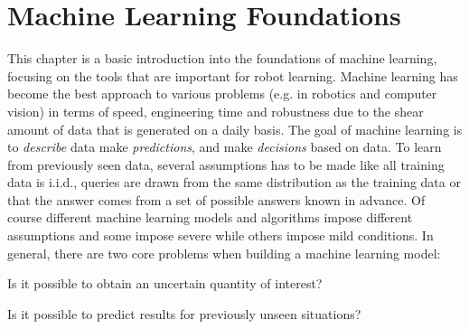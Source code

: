 \chapter{Machine Learning Foundations}
	This chapter is a basic introduction into the foundations of machine learning, focusing on the tools that are important for robot learning. Machine learning has become the best approach to various problems (e.g. in robotics and computer vision) in terms of speed, engineering time and robustness due to the shear amount of data that is generated on a daily basis. The goal of machine learning is to \emph{describe} data make \emph{predictions}, and make \emph{decisions} based on data. To learn from previously seen data, several assumptions has to be made like all training data is i.i.d., queries are drawn from the same distribution as the training data or that the answer comes from a set of possible answers known in advance. Of course different machine learning models and algorithms impose different assumptions and some impose severe while others impose mild conditions. In general, there are two core problems when building a machine learning model:
	\begin{description}[leftmargin=3.5cm]
		\item[Estimation] Is it possible to obtain an uncertain quantity of interest?
		\item[Generalization] Is it possible to predict results for previously unseen situations?
	\end{description}

